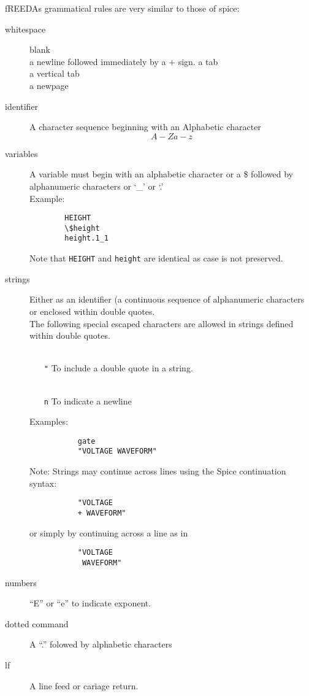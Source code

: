 fREEDAs grammatical rules are very similar to those of spice:
\begin{description}
\item[whitespace] blank\\
          a newline followed immediately by a $+$ sign.
          a tab\\
          a vertical tab\\
          a newpage
\item[identifier] A character sequence beginning with an Alphabetic
               character \[A-Za-z\]
\item[variables] A variable must begin with an alphabetic character or a \$
        followed by alphanumeric characters or `\_' or `.' \\[0.2in]
        Example: \\
        \begin{verbatim}
        HEIGHT
        \$height
        height.1_1
        \end{verbatim}
        Note that {\tt HEIGHT} and {\tt height} are identical as
        case is not preserved.
\item[strings] Either as an identifier (a continuous sequence of
alphanumeric characters or enclosed within double quotes. \\
           The following special escaped characters are allowed in
           strings defined within double quotes.
           \begin{itemize}
           \item[{\tt \\"}] To include a double quote in a string.
           \item[{\tt \\n}] To indicate a newline
           \end{itemize}
           Examples:
           \begin{verbatim}
           gate
           "VOLTAGE WAVEFORM"
           \end{verbatim}
           Note: Strings may continue across lines using the Spice
           continuation syntax:
           \begin{verbatim}
           "VOLTAGE
           + WAVEFORM"
           \end{verbatim}
           or simply by continuing across a line as in
           \begin{verbatim}
           "VOLTAGE
            WAVEFORM"
           \end{verbatim}

\item[numbers] ``E'' or ``e'' to indicate exponent.
\item[dotted command] A ``.'' folowed by alphabetic characters
\item[lf] A line feed or cariage return.
\end{description}

